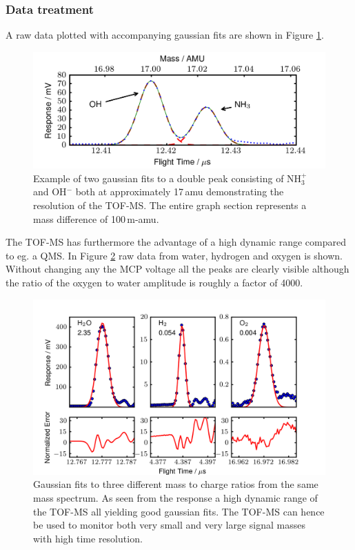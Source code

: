 \documentclass[aip,rsi]{revtex4-1}
\begin{document}
\subsubsection{Data treatment}
A raw data plotted with accompanying gaussian fits are shown in Figure \ref{fig:gaussian_fit}.
\begin{figure}
 \includegraphics[width=14cm]{ammonia_OH_gauss_fit.png}%
 \caption{Example of two gaussian fits to a double peak consisting of NH$_{3}^{+}$ and OH$^{-}$ both at approximately 17\,amu demonstrating the resolution of the TOF-MS. The entire graph section represents a mass difference of 100\,m-amu.\label{fig:gaussian_fit}}%
\end{figure}
The TOF-MS has furthermore the advantage of a high dynamic range compared to eg. a QMS. In Figure \ref{fig:dynamic_range} raw data from water, hydrogen and oxygen is shown. Without changing any the MCP voltage all the peaks are clearly visible although the ratio of the oxygen to water amplitude is roughly a factor of 4000. 
\begin{figure}
 \includegraphics[width=14cm]{dynamic_range.png}%
 \caption{Gaussian fits to three different mass to charge ratios from the same mass spectrum. As seen from the response a high dynamic range of the TOF-MS all yielding good gaussian fits. The TOF-MS can hence be used to monitor both very small and very large signal masses with high time resolution.\label{fig:dynamic_range}}%
\end{figure}
\end{document}
